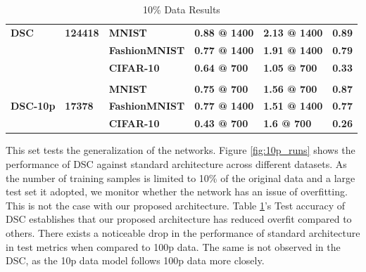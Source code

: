 \documentclass{article}
\begin{document}
\begin{table}[H]
\begin{tabular}{llllll}
\textbf{DSC}                      & \textbf{124418}                     & \textbf{MNIST}                    & \textbf{0.88 @ 1400}      & \textbf{2.13 @ 1400}  & \textbf{0.89}                     \\
\textbf{}                         & \textbf{}                           & \textbf{FashionMNIST}             & \textbf{0.77 @ 1400}      & \textbf{1.91 @ 1400}  & \textbf{0.79}                     \\
\textbf{}                         & \textbf{}                           & \textbf{CIFAR-10}                 & \textbf{0.64 @ 700}       & \textbf{1.05 @ 700}   & \textbf{0.33}                     \\
                                  &                                     &                                   &                           &                       &                                   \\
\multirow{3}{*}{\textbf{DSC-10p}} & \multirow{3}{*}{\textbf{17378}}     & \textbf{MNIST}                    & \textbf{0.75 @ 700}       & \textbf{1.56 @ 700}   & \textbf{0.87}                     \\
                                  &                                     & \textbf{FashionMNIST}             & \textbf{0.77 @ 1400}      & \textbf{1.51 @ 1400}  & \textbf{0.77}                     \\
                                  &                                     & \textbf{CIFAR-10}                 & \textbf{0.43 @ 700}       & \textbf{1.6 @ 700}    & \textbf{0.26}                     \\ \cline{3-6} 
\end{tabular}
\caption{10\% Data Results}
\label{tab:10p_data_table}
\end{table}

This set tests the generalization of the networks. Figure \ref{fig:10p_runs} shows the performance of DSC against standard architecture across different datasets. As the number of training samples is limited to 10\% of the original data and a large test set it adopted, we monitor whether the network has an issue of overfitting. This is not the case with our proposed architecture. Table \ref{tab:10p_data_table}'s Test accuracy of DSC establishes that our proposed architecture has reduced overfit compared to others. There exists a noticeable drop in the performance of standard architecture in test metrics when compared to 100p data. The same is not observed in the DSC, as the 10p data model follows 100p data more closely.
\end{document}
